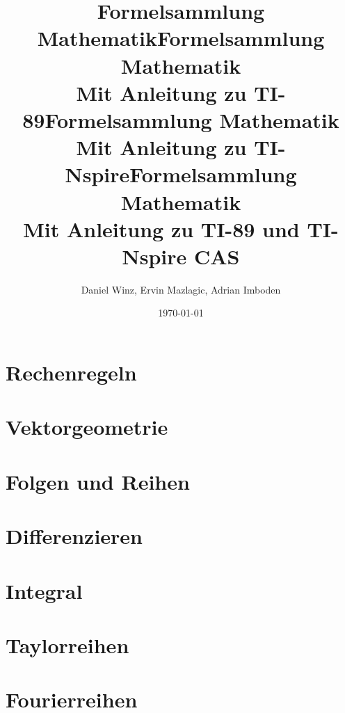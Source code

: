 \documentclass[a5paper,10pt,fleqn]{book}
\title{Formelsammlung Mathematik}
\title{Formelsammlung Mathematik \\ Mit Anleitung zu TI-89}
\title{Formelsammlung Mathematik \\ Mit Anleitung zu TI-Nspire}
\title{Formelsammlung Mathematik \\ Mit Anleitung zu TI-89 und TI-Nspire CAS}
\author{Daniel Winz, Ervin Mazlagic, Adrian Imboden}
\date{\today}
\begin{document}
\maketitle



\tableofcontents

\chapter{Rechenregeln}



\chapter{Vektorgeometrie}


\chapter{Folgen und Reihen}



\chapter{Differenzieren}




\chapter{Integral}




\chapter{Taylorreihen}


\chapter{Fourierreihen}

\end{document}
